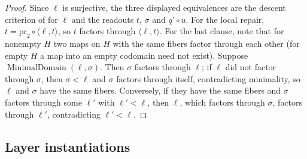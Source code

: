 \begin{proof}
Since \(\ell\) is surjective, the three displayed equivalences are the
descent criterion of  for \(\ell\) and the readouts
\(t\), \(\sigma\) and \(q'\circ u\).  For the local repair, \(t=\mathrm{pr}_2\circ\langle\ell,t\rangle\), so \(t\)
factors through \(\langle\ell,t\rangle\). For the last clause, note that for
nonempty \(H\) two maps on \(H\) with the same fibers factor through each other
(for empty \(H\) a map into an empty codomain need not exist). Suppose
\(\operatorname{MinimalDomain}(\ell,\sigma)\). Then \(\sigma\) factors through
\(\ell\); if \(\ell\) did not factor through \(\sigma\), then \(\sigma<\ell\)
and \(\sigma\) factors through itself, contradicting minimality, so \(\ell\)
and \(\sigma\) have the same fibers. Conversely, if they have the same fibers
and \(\sigma\) factors through some \(\ell'\) with \(\ell'<\ell\), then
\(\ell\), which factors through \(\sigma\), factors through \(\ell'\),
contradicting \(\ell'<\ell\).
\end{proof}

\subsection*{Layer instantiations}\label{layer-inst:F45}

